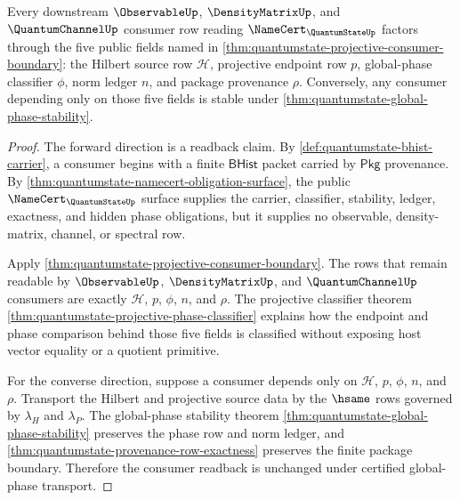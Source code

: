 \begin{theorem}
\label{thm:quantumstate-consumer-readback-completeness}
Every downstream $\ObservableUp$, $\DensityMatrixUp$, and
$\QuantumChannelUp$ consumer row reading $\NameCert_{\QuantumStateUp}$
factors through the five public fields named in
\autoref{thm:quantumstate-projective-consumer-boundary}: the Hilbert source
row $\mathcal{H}$, projective endpoint row $p$, global-phase classifier
$\phi$, norm ledger $n$, and package provenance $\rho$. Conversely, any
consumer depending only on those five fields is stable under
\autoref{thm:quantumstate-global-phase-stability}.
\end{theorem}
\begin{proof}
The forward direction is a readback claim. By
\autoref{def:quantumstate-bhist-carrier}, a consumer begins with a finite
$\mathsf{BHist}$ packet carried by $\mathsf{Pkg}$ provenance. By
\autoref{thm:quantumstate-namecert-obligation-surface}, the public
$\NameCert_{\QuantumStateUp}$ surface supplies the carrier, classifier,
stability, ledger, exactness, and hidden phase obligations, but it supplies
no observable, density-matrix, channel, or spectral row.

Apply \autoref{thm:quantumstate-projective-consumer-boundary}. The rows
that remain readable by $\ObservableUp$, $\DensityMatrixUp$, and
$\QuantumChannelUp$ consumers are exactly $\mathcal{H}$, $p$, $\phi$, $n$,
and $\rho$. The projective classifier theorem
\autoref{thm:quantumstate-projective-phase-classifier} explains how the
endpoint and phase comparison behind those five fields is classified
without exposing host vector equality or a quotient primitive.

For the converse direction, suppose a consumer depends only on
$\mathcal{H}$, $p$, $\phi$, $n$, and $\rho$. Transport the Hilbert and
projective source data by the $\hsame$ rows governed by $\lambda_H$ and
$\lambda_P$. The global-phase stability theorem
\autoref{thm:quantumstate-global-phase-stability} preserves the phase row
and norm ledger, and \autoref{thm:quantumstate-provenance-row-exactness}
preserves the finite package boundary. Therefore the consumer readback is
unchanged under certified global-phase transport.
\end{proof}

